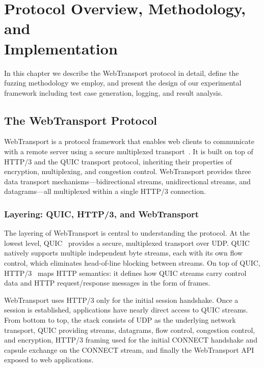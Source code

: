 \chapter{Protocol Overview, Methodology, and\\Implementation}
\label{chap:methodology}

In this chapter we describe the WebTransport protocol in detail, define the fuzzing methodology we employ, and present the design of our experimental framework including test case generation, logging, and result analysis.

\section{The WebTransport Protocol}

WebTransport is a protocol framework that enables web clients to communicate with a remote server using a secure multiplexed transport~\cite{webtransport_http3, webtransport_api}. It is built on top of HTTP/3 and the QUIC transport protocol, inheriting their properties of encryption, multiplexing, and congestion control. WebTransport provides three data transport mechanisms---bidirectional streams, unidirectional streams, and datagrams---all multiplexed within a single HTTP/3 connection.

\subsection{Layering: QUIC, HTTP/3, and WebTransport}

The layering of WebTransport is central to understanding the protocol. At the lowest level, QUIC~\cite{RFC9000} provides a secure, multiplexed transport over UDP. QUIC natively supports multiple independent byte streams, each with its own flow control, which eliminates head-of-line blocking between streams. On top of QUIC, HTTP/3~\cite{RFC9114} maps HTTP semantics: it defines how QUIC streams carry control data and HTTP request/response messages in the form of frames.

WebTransport uses HTTP/3 only for the initial session handshake. Once a session is established, applications have nearly direct access to QUIC streams. From bottom to top, the stack consists of UDP as the underlying network transport, QUIC providing streams, datagrams, flow control, congestion control, and encryption, HTTP/3 framing used for the initial CONNECT handshake and capsule exchange on the CONNECT stream, and finally the WebTransport API~\cite{webtransport_api} exposed to web applications.

